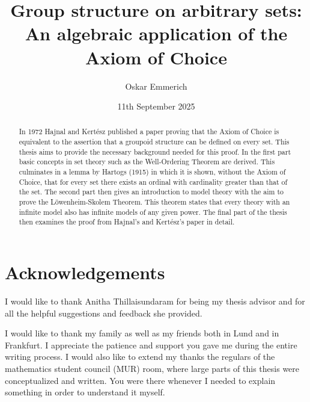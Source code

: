 \documentclass[a4paper,12pt]{memoir}
\numberwithin{equation}{section} %
\theoremstyle{plain} %
\theoremstyle{definition} %
\theoremstyle{remark} %
\begin{document}

\cleardoublepage


\author{Oskar Emmerich}

\title{Group structure on arbitrary sets:\\An algebraic application of the Axiom of Choice}

\date{11th September 2025}



\frontmatter %


\thispagestyle{empty}

\begin{abstract}
  In 1972 Hajnal and Kertész published a paper proving that the Axiom of Choice is equivalent to the assertion that a groupoid structure can be defined on every set.
  This thesis aims to provide the necessary background needed for this proof.
  In the first part basic concepts in set theory such as the Well-Ordering Theorem are derived. 
  This culminates in a lemma by Hartogs (1915) in which it is shown, without the Axiom of Choice, that for every set there exists an ordinal with cardinality greater than that of the set.
  The second part then gives an introduction to model theory with the aim to prove the Löwenheim-Skolem Theorem.
  This theorem states that every theory with an infinite model also has infinite models of any given power.
  The final part of the thesis then examines the proof from Hajnal's and Kertész's paper in detail.
\end{abstract}



\chapter*{Acknowledgements}
I would like to thank Anitha Thillaisundaram for being my thesis advisor and for all the helpful suggestions and feedback she provided.

I would like to thank my family as well as my friends both in Lund and in Frankfurt. 
I appreciate the patience and support you gave me during the entire writing process.
I would also like to extend my thanks the regulars of the mathematics student council (MUR) room, where large parts of this thesis were conceptualized and written.
You were there whenever I needed to explain something in order to understand it myself.
\end{document}

